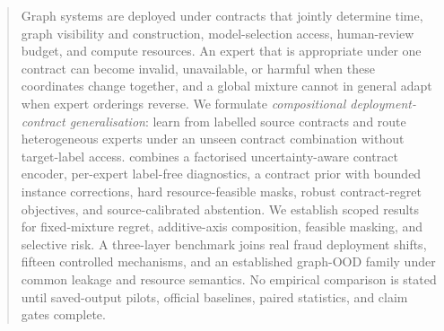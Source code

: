 \begin{abstract}
Graph systems are deployed under contracts that jointly determine time, graph visibility and construction, model-selection access, human-review budget, and compute resources. An expert that is appropriate under one contract can become invalid, unavailable, or harmful when these coordinates change together, and a global mixture cannot in general adapt when expert orderings reverse. We formulate \emph{compositional deployment-contract generalisation}: learn from labelled source contracts and route heterogeneous experts under an unseen contract combination without target-label access. \method{} combines a factorised uncertainty-aware contract encoder, per-expert label-free diagnostics, a contract prior with bounded instance corrections, hard resource-feasible masks, robust contract-regret objectives, and source-calibrated abstention. We establish scoped results for fixed-mixture regret, additive-axis composition, feasible masking, and selective risk. A three-layer benchmark joins real fraud deployment shifts, fifteen controlled mechanisms, and an established graph-OOD family under common leakage and resource semantics.  No empirical comparison is stated until saved-output pilots, official baselines, paired statistics, and claim gates complete.
\end{abstract}
